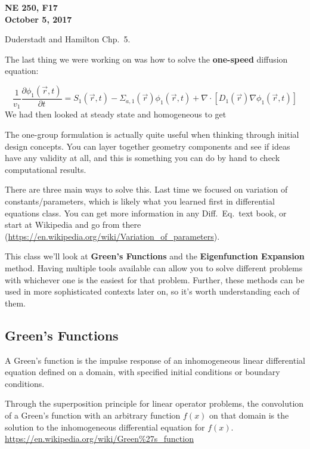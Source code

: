 \documentclass[12pt]{article}
\newif\ifeqns
\newcommand{\rvec}{\ensuremath{\vec{r}}}
\newcommand{\vecr}{\ensuremath{\vec{r}}}
\begin{document}
\begin{center}
{\bf NE 250, F17\\
October 5, 2017 
}
\end{center}

Duderstadt and Hamilton Chp.\ 5.

The last thing we were working on was how to solve the \textbf{one-speed} diffusion equation:

\begin{equation*}
\frac{1}{v_1}\frac{\partial \phi_1(\rvec,t)}{\partial t} = S_1(\rvec,t) - 
\Sigma_{a,1}(\rvec)\phi_1(\rvec,t) + \nabla\cdot[D_1(\rvec)\nabla\phi_1(\rvec,t)]
\end{equation*}
We had then looked at steady state and homogeneous to get 
\ifeqns
\begin{equation*}
\nabla^2\phi(\vecr) - \frac{1}{L^2}\phi(\rvec) = -\frac{S(\rvec)}{D},
\end{equation*}
\else
\vspace*{3em}
\fi

The one-group formulation is actually quite useful when thinking through initial design concepts. You can layer together geometry components and see if ideas have any validity at all, and this is something you can do by hand to check computational results. 

There are three main ways to solve this. Last time we focused on variation of constants/parameters, which is likely what you learned first in differential equations class. You can get more information in any Diff.\ Eq.\ text book, or start at Wikipedia and go from there (\url{https://en.wikipedia.org/wiki/Variation_of_parameters}).

This class we'll look at \textbf{Green's Functions} and the \textbf{Eigenfunction Expansion} method. Having multiple tools available can allow you to solve different problems with whichever one is the easiest for that problem. Further, these methods can be used in more sophisticated contexts later on, so it's worth understanding each of them. 

\subsection*{Green's Functions}
A Green's function is the impulse response of an inhomogeneous linear differential equation defined on a domain, with specified initial conditions or boundary conditions.

Through the superposition principle for linear operator problems, the convolution of a Green's function with an arbitrary function $f(x)$ on that domain is the solution to the inhomogeneous differential equation for $f (x)$. \url{https://en.wikipedia.org/wiki/Green\%27s_function}
\end{document}
